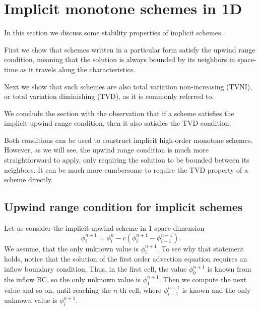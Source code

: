 \documentclass[../thesis.tex]{subfiles}
\begin{document}
\section{Implicit monotone schemes in 1D}
In this section we discuss some stability properties of implicit schemes.

First we show that schemes written in a particular form satisfy the upwind range condition, meaning that the solution is
always bounded by its neighbors in space-time
as it travels along the characteristics.

Next we show that such schemes are also total variation non-increasing (TVNI),
or total variation diminishing (TVD), as it is commonly referred to.

We conclude the section with the observation that if a scheme satisfies the
implicit upwind range condition, then it also satisfies the TVD condition.

Both conditions can be used to construct implicit high-order monotone schemes.
However, as we will see, the upwind range condition is much more straightforward to
apply, only requiring the solution to be bounded between its neighbors. It can be much more cumbersome to require the TVD property of a scheme directly.
\subsection{Upwind range condition for implicit schemes}
Let us consider the implicit upwind scheme in 1 space dimension
\begin{equation}\label{eqn:implicit-upwind-1d}
    \phi_{i}^{n+1} =
    \phi_{i}^{n} - c\left( \phi_{i}^{n+1} - \phi_{i-1}^{n+1} \right).
\end{equation}
We assume, that the only unknown value is \(\phi_{i}^{n+1}\).
To see why that statement holds, notice that the solution of the first order advection
equation requires an inflow boundary condition. Thus, in the first cell, the value \(\phi_{0}^{n+1}\) is known from the inflow BC, so the only unknown value is \(\phi_{1}^{n+1}\). Then we compute the next value and so on, until reaching the \(n\)-th cell, where \(\phi_{i-1}^{n+1}\) is known and the only unknown value is \(\phi_{i}^{n+1}\).
\end{document}
